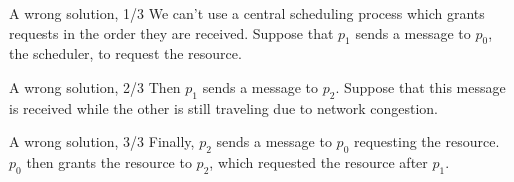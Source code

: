 \documentclass[12pt]{beamer}
\begin{document}
    \begin{frame}{A wrong solution, 1/3}
        We can't use a central scheduling process which grants requests in the
        order they are received. Suppose that \(p_1\) sends a message to \(p_0\),
        the scheduler, to request the resource.
        \begin{figure}
        \end{figure}
    \end{frame}

    \begin{frame}{A wrong solution, 2/3}
        Then \(p_1\) sends a message to \(p_2\). Suppose that this message is
        received while the other is still traveling due to network congestion.
        \begin{figure}
        \end{figure}
    \end{frame}

    \begin{frame}{A wrong solution, 3/3}
        Finally, \(p_2\) sends a message to \(p_0\) requesting the resource.
        \(p_0\) then grants the resource to \(p_2\), which requested the
        resource after \(p_1\).
        \begin{figure}
        \end{figure}
    \end{frame}
\end{document}
